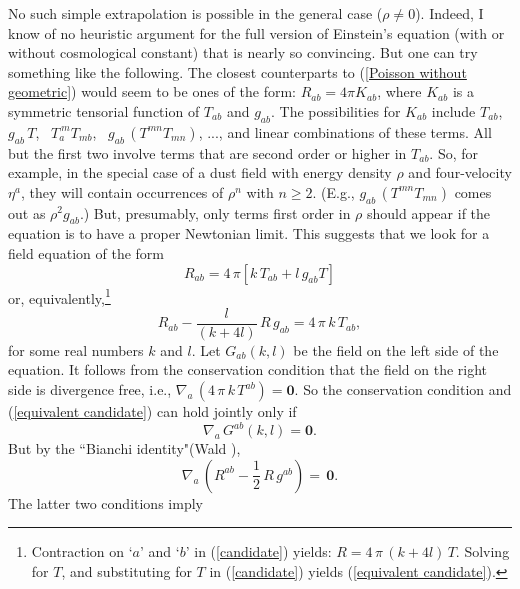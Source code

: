 \documentclass [12] {article}
\theoremstyle{plain}
\numberwithin{figure}{subsection}
\numberwithin{proposition}{subsection}
\begin{document}
No such simple extrapolation is possible in the general case ($\rho \neq 0$). Indeed, I know of no heuristic argument for the full version of Einstein's equation (with or without cosmological constant) that is nearly so convincing.  But one can try something like the following.
The closest counterparts to (\ref{Poisson without geometric}) would seem to be ones of the form:  $R_{ab} = 4 \pi K_{ab}$, where $ K_{ab}$ is a symmetric tensorial function of $T_{ab}$ and $g_{ab}$.  The possibilities for $K_{ab}$ include   $T_{ab}$, \,  $g_{ab} \, T$,  \,  $T_{a}^{\ m}  T_{mb}$, \,  $g_{ab} \, (T^{mn} T_{mn})$, ...,  and linear combinations of these terms.    All but the first two involve terms that are second order or higher in $T_{ab}$. So, for example, in the special case of a dust field with energy density $\rho$ and four-velocity $\eta^a$,  they will  contain occurrences of $\rho^n$ with $n \geq 2$. (E.g., $g_{ab} \, (T^{mn} T_{mn})$ comes out as $\rho^2 g_{ab}$.)  But, presumably, only terms first order in $\rho$ should appear if the equation is to have a proper Newtonian limit.  This suggests that we look for a field equation of the form
%
\begin{equation} \label{candidate}
R_{ab} = 4 \, \pi  \left[k \, T_{ab} + l \,  g_{ab} T\right]
\end{equation}
or, equivalently,\footnote{Contraction on `$a$' and `$b$' in (\ref{candidate}) yields:  $R = 4 \, \pi  \,  (k + 4l) \, T$.  Solving for $T$, and substituting for $T$ in (\ref{candidate}) yields (\ref{equivalent candidate}).}  
\begin{equation} \label{equivalent candidate}
R_{ab}  - \frac{l}{(k+4l)}\,  R \,  g_{ab} =   4 \, \pi  \,  k  \, T_{ab},
\end{equation}
for some real  numbers  $k$ and $l$. Let $G_{ab}(k,l)$ be the field on the left side of the equation. It follows from the conservation condition that the field on the right side is divergence free, i.e.,  $\nabla_a \, ( 4 \, \pi  \,  k  \, T^{ab})  =  \mathbf{0}$.  So the conservation condition and (\ref{equivalent candidate}) can hold jointly only if
%
\begin{equation*}
\nabla_a \,  G^{ab}(k, l)  =  \mathbf{0}. 
\end{equation*} 
%
But by the ``Bianchi identity"(Wald ),  
%
\begin{equation} \label{Bianchi} 
\nabla_a \, (R^{ab}  - \frac{1}{2} \, R \, g^{ab})  = \, \mathbf{0}.  
\end{equation} 
The latter two conditions imply
\end{document}
